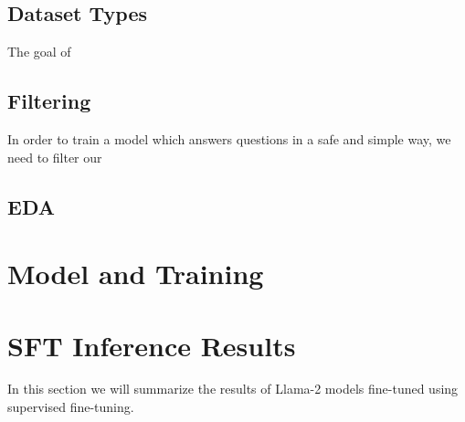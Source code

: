 \documentclass[11pt, oneside]{article}   	%
\begin{document}
\subsection{Dataset Types}
The goal of 


\subsection{Filtering}
In order to train a model which answers questions in a safe and simple way, we need to filter our


\subsection{EDA}
\section{Model and Training}
\section{SFT Inference Results}
In this section we will summarize the results of Llama-2 models fine-tuned using supervised fine-tuning.
\end{document}
